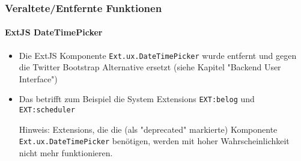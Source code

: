 
\begin{frame}[fragile]
	\frametitle{Veraltete/Entfernte Funktionen}
	\framesubtitle{ExtJS DateTimePicker}

	\begin{itemize}

		\item Die ExtJS Komponente \texttt{Ext.ux.DateTimePicker} wurde entfernt und gegen
			die Twitter Bootstrap Alternative ersetzt (siehe Kapitel "Backend User Interface")

		\item Das betrifft zum Beispiel die System Extensions \texttt{EXT:belog} und \texttt{EXT:scheduler}

			\vspace{0.2cm}

			\begingroup
				\color{red}
					Hinweis: Extensions, die die (als "deprecated" markierte)
					Komponente \texttt{Ext.ux.DateTimePicker} benötigen, werden
					mit hoher Wahrscheinlichkeit nicht mehr funktionieren.
			\endgroup

	\end{itemize}

\end{frame}


